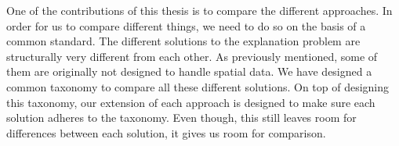 %
%

One of the contributions of this thesis is to compare the different approaches. In order for us to compare different things, we need to do so on the basis of a common standard. The different solutions to the explanation problem are structurally very different from each other. As previously mentioned, some of them are originally not designed to handle spatial data. We have designed a common taxonomy to compare all these different solutions. On top of designing this taxonomy, our extension of each approach is designed to make sure each solution adheres to the taxonomy. Even though, this still leaves room for differences between each solution, it gives us room for comparison.

